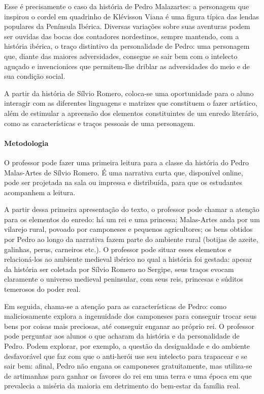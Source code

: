 \documentclass[11pt]{extarticle}
\begin{document}
Esse é precisamente o caso da história de Pedro Malazartes: a personagem que inspirou o cordel em quadrinho de Klévisson Viana é uma figura típica das lendas populares da Península Ibérica. Diversas variações sobre suas aventuras podem ser ouvidas das bocas dos contadores nordestinos, sempre mantendo, com a história ibérica, o traço distintivo da personalidade de Pedro: uma personagem que, diante das maiores adversidades, consegue se sair bem com o intelecto aguçado e invencionices que permitem-lhe driblar as adversidades do meio e de sua condição social.

A partir da história de Sílvio Romero, coloca-se uma oportunidade para o aluno interagir com as diferentes linguagens e matrizes que constituem o fazer artístico, além de estimular a apreensão dos elementos constituintes de um enredo literário, como as características e traços pessoais de uma personagem.


\paragraph{Metodologia} O professor pode fazer uma primeira leitura para a classe da história do Pedro Malas-Artes de Sílvio Romero. É uma narrativa curta que, disponível online, pode ser projetada na sala ou impressa e distribuída, para que os estudantes acompanhem a leitura.

A partir dessa primeira apresentação do texto, o professor pode chamar a atenção para os elementos do enredo: há um rei e uma princesa; Malas-Artes anda por um vilarejo rural, povoado por camponeses e pequenos agricultores; os bens obtidos por Pedro ao longo da narrativa fazem parte do ambiente rural (botijas de azeite, galinhas, perus, carneiros etc.).
O professor pode situar esses elementos e relacioná-los ao ambiente medieval ibérico no qual a história foi gestada: apesar da história ser coletada por Sílvio Romero no Sergipe, seus traços evocam claramente o universo medieval peninsular, com seus reis, princesas e súditos temerosos do poder real.

Em seguida, chama-se a atenção para as características de Pedro: como maliciosamente explora a ingenuidade dos camponeses para conseguir trocar seus bens por coisas mais preciosas, até conseguir enganar ao próprio rei.
O professor pode perguntar aos alunos o que acharam da história e da personalidade de Pedro.
Podem explorar, por exemplo, a questão da desigualdade e do ambiente desfavorável que faz com que o anti-herói use seu intelecto para trapacear e se sair bem: afinal, Pedro não engana os camponeses gratuitamente, mas utiliza-se de artimanhas para ganhar os favores do rei em uma terra e uma época em que prevalecia a miséria da maioria em detrimento do bem-estar da família real.
\end{document}
